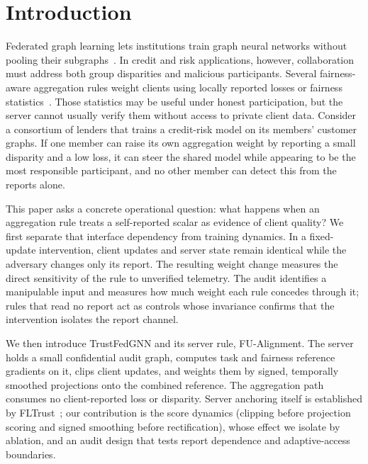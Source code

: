 \section{Introduction}
\label{sec:introduction}

Federated graph learning lets institutions train graph neural networks without pooling their subgraphs~\citep{kipf2016semi,velickovic2017graph,mcmahan2017communication,kairouz2021advances}. In credit and risk applications, however, collaboration must address both group disparities and malicious participants. Several fairness-aware aggregation rules weight clients using locally reported losses or fairness statistics~\citep{ezzeldin2023fairfed,li2020fair,f2gnn2023,khan2026fedgraphfair,bendoukha2025popets,dang2026fedfairgnn}. Those statistics may be useful under honest participation, but the server cannot usually verify them without access to private client data. Consider a consortium of lenders that trains a credit-risk model on its members' customer graphs. If one member can raise its own aggregation weight by reporting a small disparity and a low loss, it can steer the shared model while appearing to be the most responsible participant, and no other member can detect this from the reports alone.

This paper asks a concrete operational question: what happens when an aggregation rule treats a self-reported scalar as evidence of client quality? We first separate that interface dependency from training dynamics. In a fixed-update intervention, client updates and server state remain identical while the adversary changes only its report. The resulting weight change measures the direct sensitivity of the rule to unverified telemetry. The audit identifies a manipulable input and measures how much weight each rule concedes through it; rules that read no report act as controls whose invariance confirms that the intervention isolates the report channel.

We then introduce TrustFedGNN and its server rule, FU-Alignment. The server holds a small confidential audit graph, computes task and fairness reference gradients on it, clips client updates, and weights them by signed, temporally smoothed projections onto the combined reference. The aggregation path consumes no client-reported loss or disparity. Server anchoring itself is established by FLTrust~\citep{cao2021fltrust}; our contribution is the score dynamics (clipping before projection scoring and signed smoothing before rectification), whose effect we isolate by ablation, and an audit design that tests report dependence and adaptive-access boundaries.

